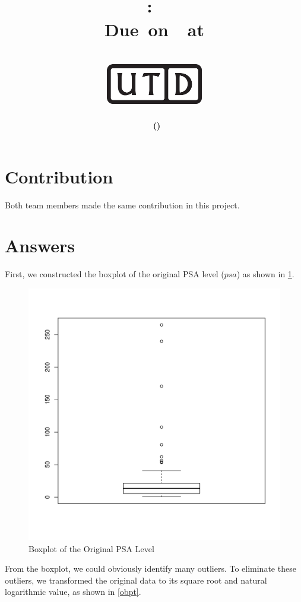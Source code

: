 \documentclass[12pt,letterpaper,titlepage,en-US]{article}
\title{
    \vspace{1in}
    \textmd{\textbf{\hmwkClassName \\\hmwkClass:\ \hmwkTitle }}\\
    \normalsize\vspace{0.1in}\small{Due\ on\ \DTMusedate{DueDate}\ at \DTMusetime{DueDate} }\\
    \vspace{0.1in}\large{\textit{\hmwkClassInstructor}}\\
    \vspace{0.5in}\includegraphics[height=2.4em]{UTD_logo_BW}\\
    \vspace{2in}
}
\author{\textbf{\hmwkAuthorName\ \footnotesize{(\hmwkAuthorNetID)}} \\ }
\date{}
\begin{document}
\maketitle

\tableofcontents
\pagebreak
{}

\section*{Contribution}
Both team members made the same contribution in this project.

\section{Answers}
First, we constructed the boxplot of the original PSA level ($psa$) as shown in \cref{obp}.

\begin{figure}[H]
    \centering
    \caption{Boxplot of the Original PSA Level}\label{obp}
    \includegraphics[width=.7\textwidth]{fig/boxplotpsa.pdf}
\end{figure}

From the boxplot, we could obviously identify many outliers.
To eliminate these outliers, we transformed the original data to
its square root and natural logarithmic value, as shown in \cref{obpt}.
\end{document}
